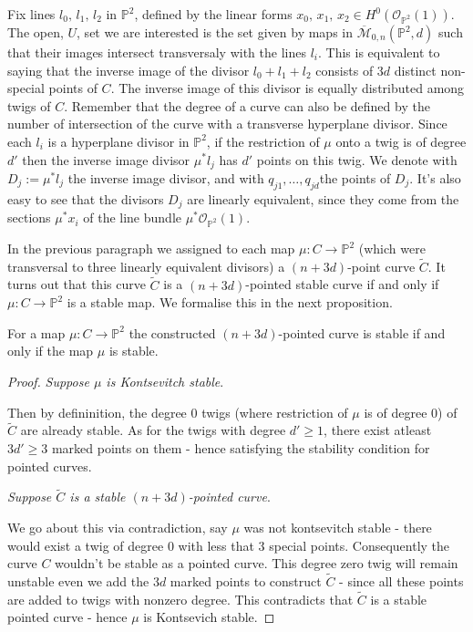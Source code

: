 \par Fix lines $l_{0},\,l_{1},\,l_{2}$ in $\mathbb{P}^{2}$, defined by the linear forms $x_{0},\, x_{1},\, x_{2} \in H^{0}(\mathcal{O}_{\mathbb{P}^{2}}(1))$.
The open, $U$, set we are interested is the set given by maps in $\overline{\mathcal{M}}_{0,n}(\mathbb{P}^{2},d)$ such that their images intersect transversaly with the lines $l_{i}$.
This is equivalent to saying that the inverse image of the divisor $l_{0}+l_{1}+l_{2}$ consists of $3d$ distinct non-special points of $C$.
The inverse image of this divisor is equally distributed among twigs of $C$.
Remember that the degree of a curve can also be defined by the number of intersection of the curve with a transverse hyperplane divisor. 
Since each $l_{i}$ is a hyperplane divisor in $\mathbb{P}^{2}$, if the restriction of $\mu$ onto a twig is of degree $d'$ then the inverse image divisor $\mu^{*}l_{j}$ has $d'$ points on this twig.
We denote with $D_{j}:= \mu^{*}l_{j}$ the inverse image divisor, and with $q_{j1}, \dots, q_{jd}$the points of $D_{j}$. It's also easy to see that the divisors $D_{j}$ are linearly equivalent, since they come from the sections $\mu^{*}x_{i}$ of the line bundle $\mu^{*}\mathcal{O}_{\mathbb{P}^{2}}(1)$.

\begin{remark}
    In the previous paragraph we assigned to each map $\mu: C \to \mathbb{P}^{2}$ (which were transversal to three linearly equivalent divisors) a $(n+3d)$-point curve $\tilde{C}$. It turns out that this curve $\tilde{C}$ is a $(n+3d)$-pointed stable curve if and only if $\mu:C \to \mathbb{P}^{2}$ is a stable map. 
    We formalise this in the next proposition.
\end{remark}
\begin{proposition}
        For a map $\mu:C \to \mathbb{P}^{2}$ the constructed $(n+3d)$-pointed curve is stable if and only if the map $\mu$ is stable.
\end{proposition}
\begin{proof}
    \par \textit{Suppose $\mu$ is Kontsevitch stable}.
    \par Then by defininition, the degree $0$ twigs (where restriction of $\mu$ is of degree $0$) of $\tilde C$ are already stable.
    As for the twigs with degree $d' \geq 1$, there exist atleast $3d'\geq 3$ marked points on them - hence satisfying the stability condition for pointed curves.
    \par \textit{Suppose $\tilde C$ is a stable $(n+3d)$-pointed curve}.
    \par We go about this via contradiction, say $\mu$ was not kontsevitch stable - there would exist a twig of degree $0$ with less that $3$ special points.
    Consequently the curve $C$ wouldn't be stable as a pointed curve.
    This degree zero twig will remain unstable even we add the $3d$ marked points to construct $\tilde C$ - since all these points are added to twigs with nonzero degree.
    This contradicts that $\tilde C$ is a stable pointed curve - hence $\mu$ is Kontsevich stable.
\end{proof} 

